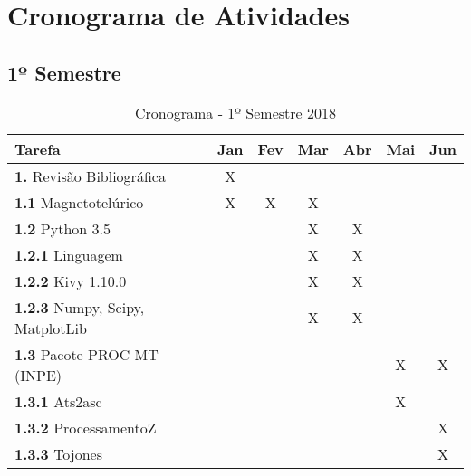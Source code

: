 
\chapter{Cronograma de Atividades}
    \label{cap-cronograma}
    
    
    \section{1º Semestre}
    
    \begin{table}[h]
    \caption{Cronograma - 1º Semestre 2018}
    
    \begin{center}
    \centering
    \begin{tabular}{|l|c|c|c|c|c|c|}
    
    \hline
    {\bf Tarefa}                   		& {\bf Jan}& {\bf Fev}& {\bf Mar}& {\bf Abr}& {\bf Mai}& {\bf Jun}\\  
    \hline
    {\bf 1.} Revisão Bibliográfica 		& 	X  & 	      & 	 & 	    & 	       & 	  \\ 
    \hline
    {\bf 1.1} Magnetotelúrico      		& 	X  & 	X     & X        & 	    & 	       & 	  \\ 
    \hline
    {\bf 1.2} Python 3.5           		& 	   &          & X	 &X 	    & 	       & 	  \\ 
    \hline
    {\bf 1.2.1} Linguagem           		& 	   & 	      & X	 &X 	    & 	       & 	  \\ 
    \hline
    {\bf 1.2.2} Kivy 1.10.0           		& 	   & 	      & X	 & X	    & 	       & 	  \\ 
    \hline
    {\bf 1.2.3} Numpy, Scipy, MatplotLib        & 	   & 	      & X	 & X	    & 	       & 	  \\ 
    \hline
    {\bf 1.3} Pacote PROC-MT (INPE)           	& 	   & 	      & 	 & 	    & X	       & X	  \\ 
    \hline
    {\bf 1.3.1} Ats2asc           		& 	   & 	      & 	 & 	    &X 	       & 	  \\ 
    \hline
    {\bf 1.3.2} ProcessamentoZ           	& 	   & 	      & 	 & 	    & 	       & X	  \\ 
    \hline
    {\bf 1.3.3} Tojones           		& 	   & 	      & 	 & 	    & 	       & X	  \\ 
    \hline
   
    
    
    \end{tabular}
 
   
    \end{center}

    \end{table}

